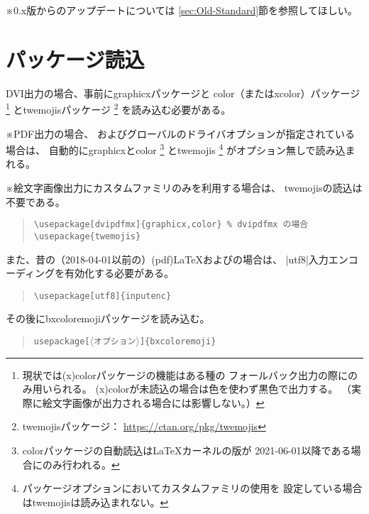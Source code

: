\documentclass[a4paper]{ltjsarticle}
\newcommand{\Pkg}[1]{\textsf{#1}}
\newcommand{\Meta}[1]{$\langle$\mbox{}#1\mbox{}$\rangle$}
\newcommand{\RMeta}[1]{{\Meta{\rmfamily#1}}}
\newcommand{\Note}{\par\noindent ※}
\newcommand{\Means}{：\quad}
\newcommand{\／}{\mbox{}／\mbox{}}
\newcommand{\cs}[1]{\symbol{`\\}#1}
\begin{document}
\Note 0.x版からのアップデートについては
\ref{sec:Old-Standard}節を参照してほしい。

\section{パッケージ読込}
\label{sec:Loading}

DVI出力の場合、事前に\Pkg{graphicx}パッケージと
\Pkg{color}（または\Pkg{xcolor}）パッケージ
\footnote{現状では\Pkg{(x)color}パッケージの機能はある種の
  フォールバック出力の際にのみ用いられる。
  \Pkg{(x)color}が未読込の場合は色を使わず黒色で出力する。
  （実際に絵文字画像が出力される場合には影響しない。）}%
と\Pkg{twemojis}パッケージ
\footnote{\Pkg{twemojis}パッケージ\Means
  \url{https://ctan.org/pkg/twemojis}}%
を読み込む必要がある。

\Note PDF出力の場合、
およびグローバルのドライバオプションが指定されている場合は、
自動的に\Pkg{graphicx}と\Pkg{color}%
\footnote{\Pkg{color}パッケージの自動読込は{\LaTeX}カーネルの版が
  2021-06-01以降である場合にのみ行われる。}%
と\Pkg{twemojis}%
\footnote{パッケージオプションにおいてカスタムファミリの使用を
  設定している場合は\Pkg{twemojis}は読み込まれない。}%
がオプション無しで読み込まれる。
\Note 絵文字画像出力にカスタムファミリのみを利用する場合は、
\Pkg{twemojis}の読込は不要である。

\begin{quote}\small\begin{verbatim}
\usepackage[dvipdfmx]{graphicx,color} % dvipdfmx の場合
\usepackage{twemojis}
\end{verbatim}\end{quote}

また、昔の（2018-04-01以前の）(pdf){\LaTeX}および{\pLaTeX}の場合は、
|utf8|入力エンコーディングを有効化する必要がある。

\begin{quote}\small\begin{verbatim}
\usepackage[utf8]{inputenc}
\end{verbatim}\end{quote}

その後に\Pkg{bxcoloremoji}パッケージを読み込む。

\begin{quote}\small\begin{alltt}
\cs{usepackage}[\RMeta{オプション}]\{bxcoloremoji\}
\end{alltt}\end{quote}
\end{document}
